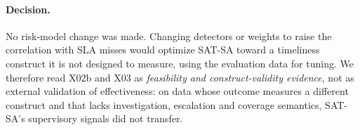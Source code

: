 \paragraph{Decision.} No risk-model change was made. Changing detectors or weights to
raise the correlation with SLA misses would optimize SAT-SA toward a timeliness
construct it is not designed to measure, using the evaluation data for tuning. We
therefore read X02b and X03 as \emph{feasibility and construct-validity evidence}, not
as external validation of effectiveness: on data whose outcome measures a different
construct and that lacks investigation, escalation and coverage semantics, SAT-SA's
supervisory signals did not transfer.
